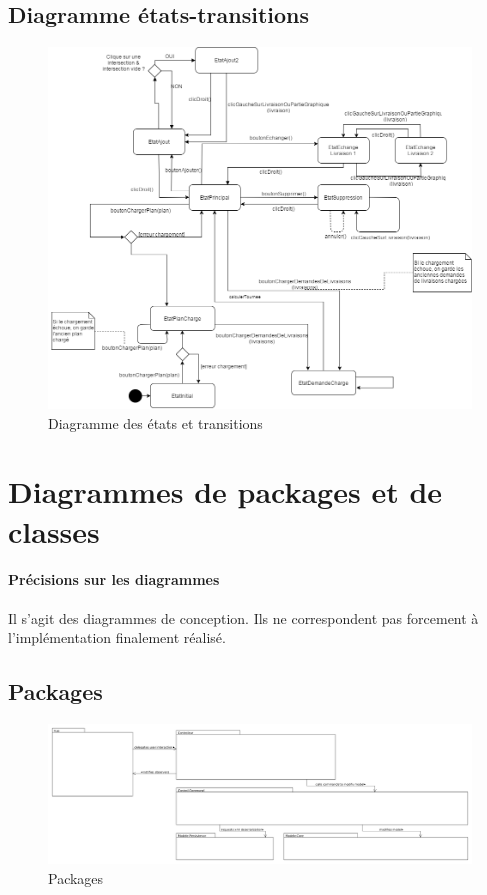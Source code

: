 \documentclass[10pt,a4paper]{book}
\begin{document}
\subsection{Diagramme états-transitions}
\begin{figure}[h!]
    \centering
    \includegraphics[scale=0.35]{diag-et-trans.png}
    \caption{Diagramme des états et transitions}
\end{figure}
\section{Diagrammes de packages et de classes}
\paragraph{Précisions sur les diagrammes}
Il s'agit des diagrammes de conception. Ils ne correspondent pas forcement à l'implémentation finalement réalisé.
\subsection{Packages}
\begin{figure}[h!]
    \centering
    \includegraphics[scale=0.2]{packages.png}
    \caption{Packages}
\end{figure}
\newpage
\end{document}
